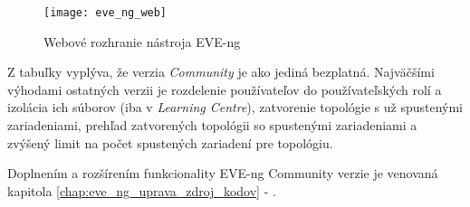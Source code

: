 \begin{figure}
    \centering
    \texttt{[image: eve\_ng\_web]}
    \caption{Webové rozhranie nástroja EVE-ng}
    \label{obr:eve_ng_web}
\end{figure}

Z tabuľky vyplýva, že verzia \emph{Community} je ako jediná bezplatná. Najväčšími výhodami ostatných verzii je rozdelenie používateľov do používateľských rolí a izolácia ich súborov (iba v \emph{Learning Centre}), zatvorenie topológie s už spustenými zariadeniami, prehľad zatvorených topológii so spustenými zariadeniami a zvýšený limit na počet spustených zariadení pre topológiu.

Doplnením a rozšírením funkcionality EVE-ng Community verzie je venovaná kapitola \ref{chap:eve_ng_uprava_zdroj_kodov} - .

\newpage

